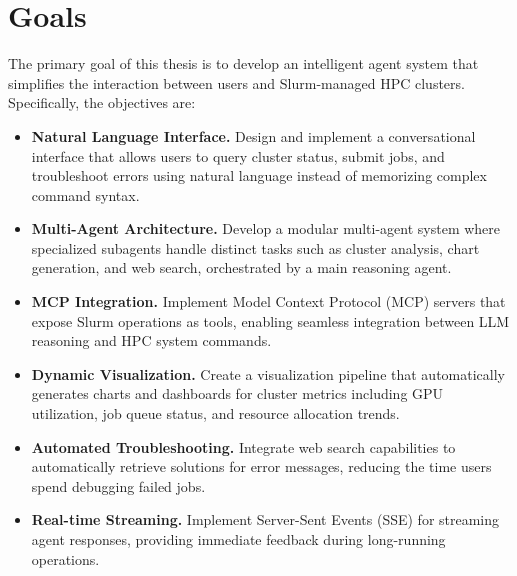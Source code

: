 \section{Goals}

The primary goal of this thesis is to develop an intelligent agent system that simplifies the interaction between users and Slurm-managed HPC clusters. Specifically, the objectives are:

\begin{itemize}
    \item \textbf{Natural Language Interface.} Design and implement a conversational interface that allows users to query cluster status, submit jobs, and troubleshoot errors using natural language instead of memorizing complex command syntax.
    
    \item \textbf{Multi-Agent Architecture.} Develop a modular multi-agent system where specialized subagents handle distinct tasks such as cluster analysis, chart generation, and web search, orchestrated by a main reasoning agent.
    
    \item \textbf{MCP Integration.} Implement Model Context Protocol (MCP) servers that expose Slurm operations as tools, enabling seamless integration between LLM reasoning and HPC system commands.
    
    \item \textbf{Dynamic Visualization.} Create a visualization pipeline that automatically generates charts and dashboards for cluster metrics including GPU utilization, job queue status, and resource allocation trends.
    
    \item \textbf{Automated Troubleshooting.} Integrate web search capabilities to automatically retrieve solutions for error messages, reducing the time users spend debugging failed jobs.
    
    \item \textbf{Real-time Streaming.} Implement Server-Sent Events (SSE) for streaming agent responses, providing immediate feedback during long-running operations.
\end{itemize}
